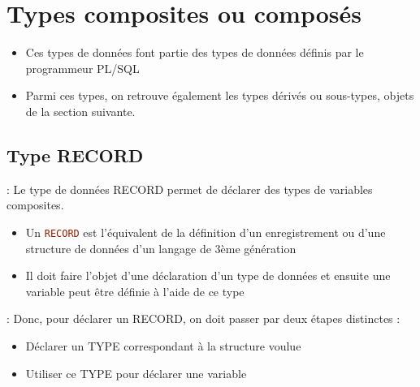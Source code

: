 \documentclass[10pt]{beamer}
\begin{document}
\begin{frame}{\secname}
    
\end{frame}

\begin{frame}{\secname}
    
\end{frame}

\section{Types composites ou composés}
\begin{frame}{\secname}
    \begin{itemize}
        \item Ces types de données font partie des types de données définis par le programmeur PL/SQL
        \item Parmi ces types, on retrouve également les types dérivés ou sous-types, objets de la section suivante.
    \end{itemize}
\end{frame}

\subsection{Type RECORD}
\begin{frame}{\secname : \subsecname}
    Le type de données RECORD permet de déclarer des types de variables composites.
    \begin{itemize}
        \item Un \lstinline[language=sql]!RECORD! est l'équivalent de la définition d'un enregistrement ou d'une structure de données d'un langage de 3ème génération
        \item Il doit faire l'objet d'une déclaration d'un type de données et ensuite une variable peut être définie à l'aide de ce type
    \end{itemize}
\end{frame}

\begin{frame}{\secname : \subsecname}
    Donc, pour déclarer un RECORD, on doit passer par deux étapes distinctes :
    \begin{itemize}
        \item Déclarer un TYPE correspondant à la structure voulue
        \item Utiliser ce TYPE pour déclarer une variable
    \end{itemize}
\end{frame}
\end{document}
